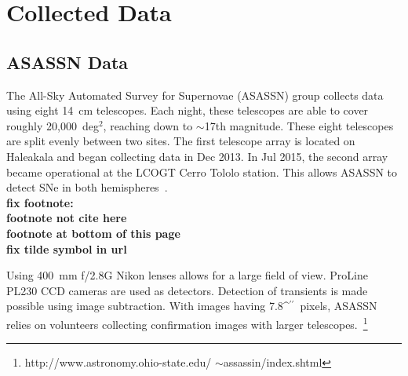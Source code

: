 \documentclass[aps,prb,twocolumn,superscriptaddress]{revtex4-1}
\def\arcsec{\ifmmode^{\prime\prime}\else$^{\prime\prime}$\fi}
\begin{document}
\section{Collected Data}

\subsection{ASASSN Data}

\indent The All-Sky Automated Survey for Supernovae (ASASSN) group 
collects data using eight 14~cm telescopes. Each night, these  
telescopes are able to cover roughly 20,000~deg$^2$, reaching 
down to $\sim$17th magnitude.
These eight telescopes are split evenly between two sites.
The first telescope array is located on Haleakala and began 
collecting data in Dec 2013. In Jul 2015, the second %
array became operational at the LCOGT Cerro Tololo station. 
This allows ASASSN to detect SNe in both 
hemispheres~\cite{asn_data}.
~\\{\bf fix footnote:\\
\indent footnote not cite here\\
\indent footnote at bottom of this page\\
\indent fix tilde symbol in url
}



\indent Using 400~mm f/2.8G Nikon lenses allows for a large field of 
view. ProLine PL230 CCD cameras are used as detectors. Detection of 
transients is made possible using image subtraction. With images 
having 7.8\arcsec\ pixels, ASASSN relies on volunteers collecting  
confirmation images with 
larger telescopes.~\footnote{\label{foot:asn} http://www.astronomy.ohio-state.edu/ $\sim$assassin/index.shtml}
\end{document}

